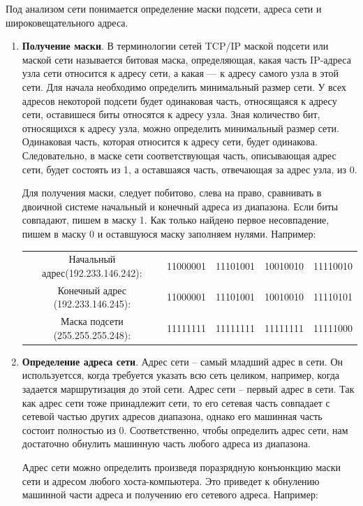 \documentclass[a4paper]{article}
\begin{document}
		Под анализом сети понимается определение маски подсети, адреса сети и широковещательного адреса.
		
		\begin{enumerate}
			\item
				\textbf{Получение маски}. В терминологии сетей TCP/IP маской подсети или маской сети называется битовая маска, определяющая, какая часть IP-адреса узла сети относится к адресу сети, а какая — к адресу самого узла в этой сети. Для начала необходимо определить минимальный размер сети. У всех адресов некоторой подсети будет одинаковая часть, относящаяся к адресу сети, оставишеся биты относятся к адресу узла. Зная количество бит, относящихся к адресу узла, можно определить минимальный размер сети. Одинаковая часть, которая относится к адресу сети, будет одинакова. Следовательно, в маске сети соответствующая часть, описывающая адрес сети, будет состоять из 1, а оставшаяся часть, отвечающая за адрес узла, из 0.

			Для получения маски, следует побитово, слева на право, сравнивать в двоичной системе начальный и конечный адреса из диапазона. Если биты совпадают, пишем в маску 1. Как только найдено первое несовпадение, пишем в маску 0 и оставшуюся маску заполняем нулями. Например:

			\begin{tabular}{|c|cccc|}
			\hline
				Начальный адрес(192.233.146.242): & 11000001 & 11101001 & 10010010 & 11110010\\
				Конечный адрес (192.233.146.245): & 11000001 & 11101001&10010010 & 11110101\\
			\hline
				Маска подсети (255.255.255.248): & 11111111&11111111 & 11111111 & 11111000\\
			\hline
			\end{tabular}

			\item
				\textbf{Определение адреса сети}. Адрес сети -- самый младший адрес в сети. Он используетсся, когда требуется  указать  всю сеть целиком, например, когда задается маршрутизация до этой сети. Адрес сети -- первый адрес в сети. Так как адрес сети тоже принадлежит сети, то его сетевая часть совпадает с сетевой частью других адресов диапазона, однако его машинная часть состоит полностью из 0. Соответственно, чтобы определить адрес сети, нам достаточно обнулить машинную часть любого адреса из диапазона.

				Адрес сети можно определить произведя поразрядную конъюнкцию маски сети и адресом любого хоста-компьютера. Это приведет к обнулению машинной части адреса и получению его сетевого адреса. Например:


\end{enumerate}
\end{document}

